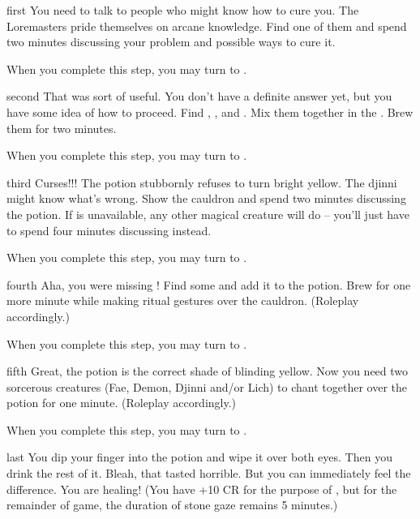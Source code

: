 \documentclass[notebook]{guildcamp2} %
\begin{document}
\startnotebook{\nStoneGaze{}}

\begin{page}{first}
You need to talk to people who might know how to cure you.  The Loremasters pride themselves on arcane knowledge.  Find one of them and spend two minutes discussing your problem and possible ways to cure it.

When you complete this step, you may turn to .
\end{page}


\begin{page}{second}
That was sort of useful.  You don't have a definite answer yet, but you have some idea of how to proceed. Find \iEyebright{}, \iGingko{}, and \iBilberries{}.  Mix them together in the \sCauldron{}.  Brew them for two minutes.

When you complete this step, you may turn to .
\end{page}


\begin{page}{third}
Curses!!!  The potion stubbornly refuses to turn bright yellow.  The djinni \cWizard{} might know what's wrong.  Show \cWizard{\them} the cauldron and spend two minutes discussing the potion.  If \cWizard{} is unavailable, any other magical creature will do -- you'll just have to spend four minutes discussing instead.

When you complete this step, you may turn to .
\end{page}


\begin{page}{fourth}
Aha, you were missing \iForsythia{}!  Find some and add it to the potion.  Brew for one more minute while making ritual gestures over the cauldron.  (Roleplay accordingly.)

When you complete this step, you may turn to .
\end{page}


\begin{page}{fifth}
Great, the potion is the correct shade of blinding yellow.  Now you need two sorcerous creatures (Fae, Demon, Djinni and/or Lich) to chant together over the potion for one minute.  (Roleplay accordingly.)

When you complete this step, you may turn to .
\end{page}

\begin{page}{last}
You dip your finger into the potion and wipe it over both eyes.  Then you drink the rest of it.  Bleah, that tasted horrible.  But you can immediately feel the difference.  You are healing! (You have +10 CR for the purpose of \aStoneGaze{}, but for the remainder of game, the duration of stone gaze remains 5 minutes.)
\end{page}

\endnotebook
\end{document}
